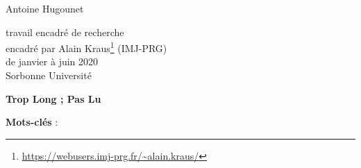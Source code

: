 \documentclass[a4paper, 12pt, oneside]{article}
\begin{document}
\begin{titlepage}
\begin{center}
	\large Antoine Hugounet \\

	\vspace{40px}
	\LARGE {}

	\vspace{40px}
	\large
	travail encadré de recherche \\
	encadré par Alain Kraus\footnote{\url{https://webusers.imj-prg.fr/~alain.kraus/}} (IMJ-PRG) \\
	de janvier à juin 2020 \\

	\vspace{20px}
	Sorbonne Université
\end{center}

\normalsize
\vspace{80px}
\begin{center} \textbf{Trop Long ; Pas Lu} \end{center}
\vspace{-1em}

\vfill
\begin{center}
	\normalsize \textbf{Mots-clés} : \textit{}
\end{center}
\end{titlepage}
\end{document}
